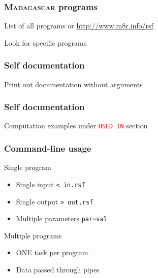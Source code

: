 \begin{frame}
  \frametitle{\textsc{Madagascar} programs}
  
  \begin{block}{List of all programs}
     or \url{http://www.m8r.info/rsf}
  \end{block}
  

  \pause
  \begin{block}{Look for specific programs}
  \end{block}
  
\end{frame}

\begin{frame}
  \frametitle{Self documentation}

  \begin{block}{Print out documentation}
     without arguments
  \end{block}
  
\end{frame}

\begin{frame}
  \frametitle{Self documentation}
  
  
  
  \pause
  \begin{block}{}
    Computation examples under \textcolor{red}{\texttt{USED IN}} section
  \end{block}
  
\end{frame} 

\begin{frame}
  \frametitle{Command-line usage}

  \begin{block}{Single program}
  \end{block}
  \begin{itemize}
  \item Single input \texttt{< in.rsf}
  \item Single output \texttt{> out.rsf}
  \item Multiple parameters \texttt{par=val}
  \end{itemize}

  \pause
  \begin{block}{Multiple programs}
  \end{block}
  \begin{itemize}
  \item ONE task per program
  \item Data passed through pipes
  \end{itemize}
\end{frame}

